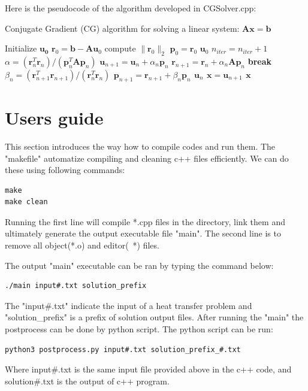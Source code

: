 \documentclass{article}
\begin{document}
Here is the pseudocode of the algorithm developed in CGSolver.cpp:

\begin{algorithm}[h]
    \caption{Conjugate Gradient (CG) algorithm 
    for solving a linear system: $\mathbf{Ax=b}$}
    \label{alg1}
    \begin{algorithmic}
        \STATE Initialize $\mathbf{u_0}$
        \STATE $\mathbf{r}_0 = \mathbf{b} - \mathbf{A} \mathbf{u}_0$
        \STATE compute $\|\mathbf{r}_0\|_2$
        \STATE $\mathbf{p}_0 = \mathbf{r}_0$
        \PRINT $\mathbf{u}_0$
            \STATE $n_{iter} = n_{iter}+1$
            \STATE $\alpha = (\mathbf{r}_n^T \mathbf{r}_n)
                /(\mathbf{p}_n^T \mathbf{A} \mathbf{p}_n)$
            \STATE $\mathbf{u}_{n+1}  
                = \mathbf{u}_n + \alpha_n \mathbf{p}_n$
            \STATE $\mathbf{r}_{n+1}  
                = \mathbf{r}_n + \alpha_n \mathbf{A} \mathbf{p}_n$
                \STATE \bf{break}
            \ENDIF
            \STATE $\beta_n 
                = (\mathbf{r}_{n+1}^T \mathbf{r}_{n+1})
                /(\mathbf{r}_n^T \mathbf{r}_n)$
            \STATE $\mathbf{p}_{n+1} 
                = \mathbf{r}_{n+1} + \beta_n \mathbf{p}_n $
                \PRINT $\mathbf{u}_n$
            \ENDIF
        \ENDWHILE
        \STATE $\mathbf{x} = \mathbf{u}_{n+1}$
        \PRINT $\mathbf{x}$
    \end{algorithmic}
\end{algorithm}


\section*{Users guide}
This section introduces the way how to compile codes and run them.
The "makefile" automatize compiling and cleaning c++ files efficiently. 
We can do these using following commands:
\begin{verbatim}
make
make clean
\end{verbatim}
Running the first line will compile *.cpp files in the directory,
 link them and ultimately generate the output executable file "main".
The second line is to remove all object(*.o) and editor(~*) files.

The output "main" executable can be ran by typing the command below:
\begin{verbatim}
./main input#.txt solution_prefix
\end{verbatim}
The "input\#.txt"  indicate the input of a heat transfer problem  
and "solution\_prefix" is a prefix of solution output files.
After running the "main" the postprocess can be done by python script.
The python script can be run:
\begin{verbatim}
python3 postprocess.py input#.txt solution_prefix_#.txt
\end{verbatim}
Where input\#.txt is the same input file provided above in the c++ code, 
and solution\#.txt is the output of c++ program.
\end{document}
